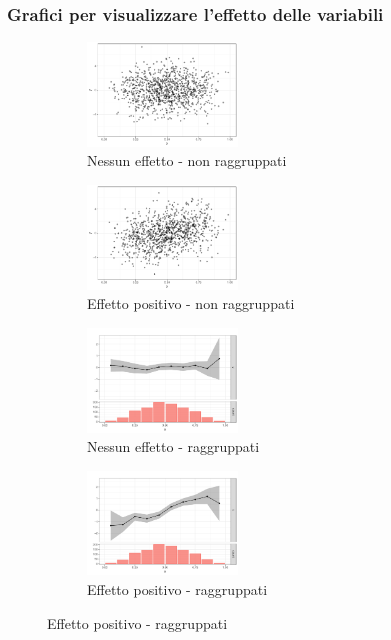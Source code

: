 \documentclass[pdf, aspectratio=169, xcolor=dvipsnames]{beamer}\usepackage[]{graphicx}\usepackage[]{color}
\theoremstyle{definition}
\begin{document}
\begin{frame}
\frametitle{Grafici per visualizzare l'effetto delle variabili}

\fontsize{9pt}{11pt}\selectfont

\begin{figure}
  \centering
  \begin{subfigure}[b]{4.8cm}
    \centering
    \caption{Nessun effetto - non raggruppati}
    \includegraphics[width=4cm]{_bookdown_files/_main_files/figure-latex/var-selection-1.pdf}
  \end{subfigure}
  \qquad
  \begin{subfigure}[b]{4.8cm}
    \centering
    \caption{Effetto positivo - non raggruppati}
    \includegraphics[width=4cm]{_bookdown_files/_main_files/figure-latex/var-selection-2.pdf}
  \end{subfigure}
  \par\medskip
  \begin{subfigure}[b]{4.8cm}
    \centering
    \caption{Nessun effetto - raggruppati}
    \includegraphics[width=4cm]{_bookdown_files/_main_files/figure-latex/var-selection-3.pdf}
  \end{subfigure}
  \qquad
  \begin{subfigure}[b]{4.8cm}
    \centering
    \caption{Effetto positivo - raggruppati}
    \includegraphics[width=4cm]{_bookdown_files/_main_files/figure-latex/var-selection-4.pdf}
  \end{subfigure}
\end{figure}

\end{frame}
\end{document}

